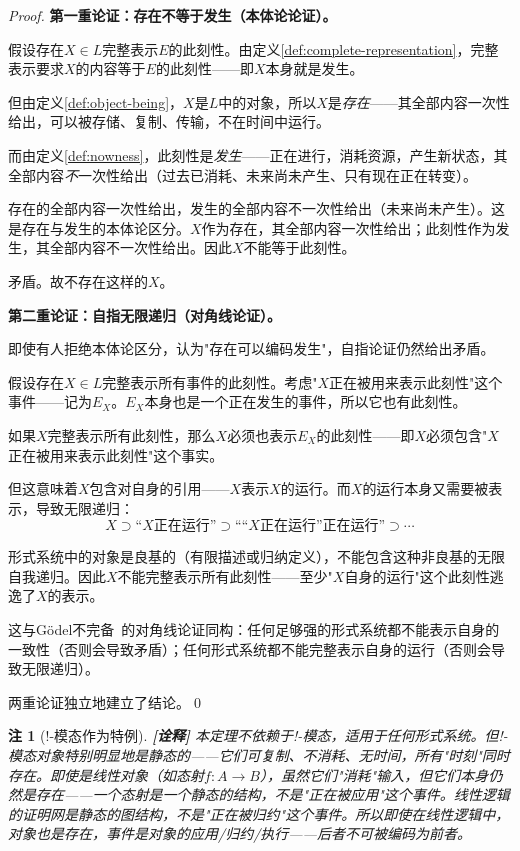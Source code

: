 \documentclass[11pt,a4paper]{article}
\newtheorem{remark}{注}
\newcommand{\lvl}[1]{\hfill\textbf{\footnotesize[#1]}}
\newcommand{\lvI}{\lvl{诠释}}
\begin{document}
\begin{proof}
\textbf{第一重论证：存在不等于发生（本体论论证）。}

假设存在$X\in L$完整表示$E$的此刻性。由定义\ref{def:complete-representation}，完整表示要求$X$的内容等于$E$的此刻性——即$X$本身就是发生。

但由定义\ref{def:object-being}，$X$是$L$中的对象，所以$X$是\emph{存在}——其全部内容一次性给出，可以被存储、复制、传输，不在时间中运行。

而由定义\ref{def:nowness}，此刻性是\emph{发生}——正在进行，消耗资源，产生新状态，其全部内容\emph{不}一次性给出（过去已消耗、未来尚未产生、只有现在正在转变）。

存在的全部内容一次性给出，发生的全部内容不一次性给出（未来尚未产生）。这是存在与发生的本体论区分。$X$作为存在，其全部内容一次性给出；此刻性作为发生，其全部内容不一次性给出。因此$X$不能等于此刻性。

矛盾。故不存在这样的$X$。

\textbf{第二重论证：自指无限递归（对角线论证）。}

即使有人拒绝本体论区分，认为"存在可以编码发生"，自指论证仍然给出矛盾。

假设存在$X\in L$完整表示所有事件的此刻性。考虑"$X$正在被用来表示此刻性"这个事件——记为$E_X$。$E_X$本身也是一个正在发生的事件，所以它也有此刻性。

如果$X$完整表示所有此刻性，那么$X$必须也表示$E_X$的此刻性——即$X$必须包含"$X$正在被用来表示此刻性"这个事实。

但这意味着$X$包含对自身的引用——$X$表示$X$的运行。而$X$的运行本身又需要被表示，导致无限递归：
$$X \supset \text{``}X\text{正在运行''} \supset \text{``}\text{``}X\text{正在运行''}\text{正在运行''} \supset \cdots$$

形式系统中的对象是良基的（有限描述或归纳定义），不能包含这种非良基的无限自我递归。因此$X$不能完整表示所有此刻性——至少"$X$自身的运行"这个此刻性逃逸了$X$的表示。

这与G\"odel不完备~\cite{godel31}的对角线论证同构：任何足够强的形式系统都不能表示自身的一致性（否则会导致矛盾）；任何形式系统都不能完整表示自身的运行（否则会导致无限递归）。

两重论证独立地建立了结论。\qed
\end{proof}

\begin{remark}[!-模态作为特例]\lvI
本定理不依赖于!-模态，适用于任何形式系统。但!-模态对象特别明显地是静态的——它们可复制、不消耗、无时间，所有"时刻"同时存在。即使是线性对象（如态射$f:A\to B$），虽然它们"消耗"输入，但它们本身仍然是存在——一个态射是一个静态的结构，不是"正在被应用"这个事件。线性逻辑的证明网是静态的图结构，不是"正在被归约"这个事件。所以即使在线性逻辑中，对象也是存在，事件是对象的应用/归约/执行——后者不可被编码为前者。
\end{remark}
\end{document}
